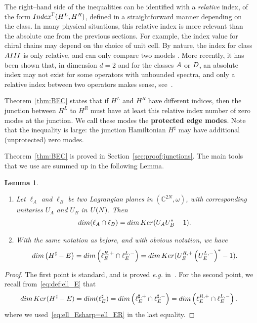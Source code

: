 \documentclass[11pt]{amsart}
\numberwithin{equation}{section} %
\newtheorem{lemma}[theorem]{Lemma}
\newcommand\1{{\mathds 1}}
\def\C{{\mathbb C}}
\def\rA{{\rm A}}
\def\rAIII{{\rm AIII}}
\def\rD{{\rm D}}
\def\U{{\rm U}}
\def\Index{{\rm Index}}
\def\Ker{{\rm Ker }}
\def\dim{{\rm dim }}
\begin{document}
The right--hand side of the inequalities can be identified with a {\em relative} index, of the form $\Index^\Gamma(H^L, H^R)$, defined in a straightforward manner depending on the class. In many physical situations, this relative index is more relevant than the absolute one from the previous sections. For example, the index value for chiral chains may depend on the choice of unit cell. By nature, the index for class $\rAIII$ is only relative, and can only compare two models \cite{ProSch-16}. More recently, it has been shown that, in dimension $d=2$ and for the classes $\rA$ or $\rD$, an absolute index may not exist for some operators with unbounded spectra, and only a relative index between two operators makes sense, see~\cite{GrafJudTau-21,Bal-22,RosTar-24}.

\medskip

Theorem~\ref{thm:BEC} states that if $H^L$ and $H^R$ have different indices, then the junction between $H^L$ to $H^R$ must have at least this relative index number of zero modes at the junction. We call these modes the {\bf protected edge modes}. Note that the inequality is large: the junction Hamiltonian $H^\sharp$ may have additional (unprotected) zero modes. 

\medskip

Theorem~\ref{thm:BEC}  is proved in Section~\ref{sec:proof:junctions}. The main tools that we use are summed up in the following Lemma.

\newpage

\begin{lemma} \label{lem:crossing_lagrangian_with_unitaries} ~
	\begin{enumerate}
		\item Let $\ell_A$ and $\ell_B$ be two Lagrangian planes in $(\C^{2N}, \omega)$, with corresponding unitaries $U_A$ and $U_B$ in $\U(N)$. Then
		\[
		\dim (\ell_A \cap \ell_B) = \dim \, \Ker (U_A U_B^* - 1).
		\]
		\item With the same notation as before, and with obvious notation, we have
		\[
		\dim \left( H^\sharp - E \right) = \dim \left( \ell^{R, +}_E \cap \ell^{L, -}_E \right) =  \dim \, \Ker (U_E^{R, +} \left(U_E^{L, -} \right)^* - 1).
		\]
	\end{enumerate}
\end{lemma}

\begin{proof}
	The first point is standard, and is proved {\em e.g.} in~\cite[Lemma 10]{Gon-23}. For the second point, we recall from~\eqref{eq:def:ell_E} that 
	\[
	\dim \, \Ker (H^\sharp - E) =  \dim (\ell_E^\sharp) = \dim \left( \ell_E^{\sharp, +} \cap \ell_E^{\sharp, -} \right) =  \dim \left( \ell^{R, +}_E \cap \ell^{L, -}_E \right).
	\]
	where we used~\eqref{eq:ell_Esharp=ell_ER} in the last equality.
\end{proof}
\end{document}
